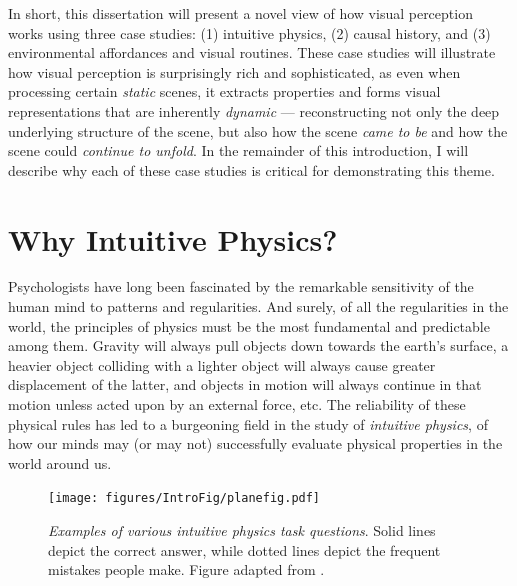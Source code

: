 In short, this dissertation will present a novel view of how visual perception works using three case studies: (1) intuitive physics, (2) causal history, and (3) environmental affordances and visual routines.  These case studies will illustrate how visual perception is surprisingly rich and sophisticated, as even when processing certain \textit{static} scenes, it extracts properties and forms visual representations that are inherently \textit{dynamic} --- reconstructing not only the deep underlying structure of the scene, but also how the scene \textit{came to be} and how the scene could \textit{continue to unfold}.  In the remainder of this introduction, I will describe why each of these case studies is critical for demonstrating this theme.

\section{Why Intuitive Physics?}
Psychologists have long been fascinated by the remarkable sensitivity of the human mind to patterns and regularities.  And surely, of all the regularities in the world, the principles of physics must be the most fundamental and predictable among them.  Gravity will always pull objects down towards the earth’s surface, a heavier object colliding with a lighter object will always cause greater displacement of the latter, and objects in motion will always continue in that motion unless acted upon by an external force, etc.  The reliability of these physical rules has led to a burgeoning field in the study of \textit{intuitive physics}, of how our minds may (or may not) successfully evaluate physical properties in the world around us. 

\begin{figure}
    \centering
    \texttt{[image: figures/IntroFig/planefig.pdf]}
    \caption
    {\textit{Examples of various intuitive physics task questions}. Solid lines depict the correct answer, while dotted lines depict the frequent mistakes people make. Figure adapted from \cite{kubricht_intuitive_2017}.}
    \label{fig:IntroFig_1}
\end{figure}

